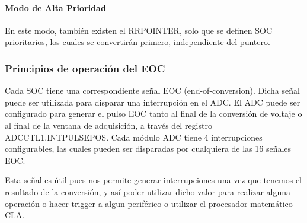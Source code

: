 \paragraph{Modo de Alta Prioridad}
\hfill \break \par
En este modo, también existen el RRPOINTER, solo que se definen SOC prioritarios, los cuales se convertirán primero, independiente del puntero.

\subsubsection{Principios de operación del EOC}
Cada SOC tiene una correspondiente señal EOC (end-of-conversion). Dicha señal puede ser utilizada para disparar una interrupción en el ADC. El ADC puede ser configurado para generar el pulso EOC tanto al final de la conversión de voltaje o al final de la ventana de adquisición, a través del registro ADCCTL1.INTPULSEPOS.
Cada módulo ADC tiene 4 interrupciones configurables, las cuales pueden ser disparadas por cualquiera de las 16 señales EOC.

Esta señal es útil pues nos permite generar interrupciones una vez que tenemos el resultado de la conversión, y así poder utilizar dicho valor para realizar alguna operación o hacer trigger a algun periférico o utilizar el procesador matemático CLA.